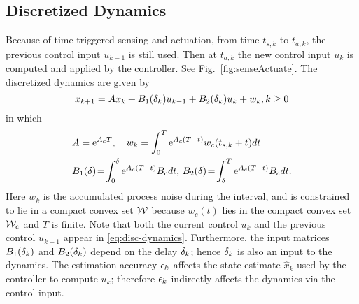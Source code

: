 \subsection{Discretized Dynamics}
Because of time-triggered sensing and actuation, from time $t_{s,k}$ to $t_{a,k}$, the  previous control input $u_{k-1}$
is still used.
Then at $t_{a,k}$ the new control input $u_{k}$
is computed and applied by the controller.
See Fig.~\ref{fig:senseActuate}.
The discretized dynamics are given by
\begin{equation}
\label{eq:disc-dynamics}
x_{k+1}=Ax_{k}+B_{1}(\delta_k)u_{k-1}+B_{2}(\delta_k)u_{k}+w_{k}, k\geq0
\end{equation}
in which
\begin{eqnarray*}
&A=\eu^{A_{c}T}, \quad
w_{k}%
=\int_{0}^{T}\eu^{A_{c}(T-t)}w_{c}(t_{s,k}+t) dt
\\
&B_{1}(\sDelay)%
\!=\!\int_{0}^{\sDelay}\eu^{A_{c}(T-t)}B_{c} dt,\,
B_{2}(\sDelay)%
\!=\!\int_{\sDelay}^{T}\eu^{A_{c}(T-t)}B_{c} dt \text.
\end{eqnarray*}
Here $w_{k}$ is the accumulated process noise during the interval, and is constrained to lie in a compact convex set $\mathcal{W}$ because $w_c(t)$ lies in the compact convex set $\mathcal{W}_c$ and $T$ is finite.
Note that both the current control $u_{k}$ and the previous
control $u_{k-1}$ appear in \eqref{eq:disc-dynamics}.
Furthermore, the input matrices $B_{1}(\delta_k)$ and $B_{2}(\delta_k)$
depend on the delay $\delta_k$; hence $\delta_k$ is also an
input to the dynamics.
The estimation accuracy $\epsilon_k$ affects the state estimate
$\hat{x}_{k}$ %
used by the controller to compute $u_{k}$;
therefore $\epsilon_k$ indirectly affects the dynamics via the control
input.







